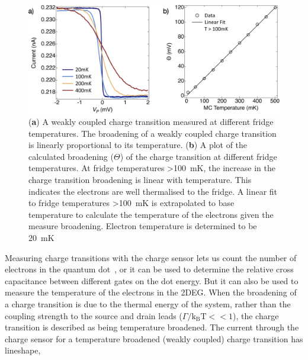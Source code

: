 \begin{figure}[!htb]
  \begin{center}
    \includegraphics[width=1.0\textwidth]{figures/ch1/crop_FiguresMaster.007.png}
    \caption[Calculating the electron temperature]{\label{fig:ch1/electron_temp} 
    (\textbf{a}) A weakly coupled charge transition measured at different fridge temperatures. The broadening of a weakly coupled charge transition is linearly proportional to its temperature. (\textbf{b}) A plot of the calculated broadening ($\Theta$) of the charge transition at different fridge temperatures. At fridge temperatures \qty{>100}{mK}, the increase in the charge transition broadening is linear with temperature. This indicates the electrons are well thermalised to the fridge. A linear fit to fridge temperatures \qty{>100}{mK} is extrapolated to base temperature to calculate the temperature of the electrons given the measure broadening. Electron temperature is determined to be \qty{20}{mK}
      }
  \end{center}
\end{figure}

Measuring charge transitions with the charge sensor lets us count the number of electrons in the quantum dot~\cite{electron_counting}, or it can be used to determine the relative cross capacitance between different gates on the dot energy.
But it can also be used to measure the temperature of the electrons in the 2DEG. When the broadening of a charge transition is due to the thermal energy of the system, rather than the coupling strength to the source and drain leads ($\Gamma/\mathrm{k_BT} << 1$), the charge transition is described as being temperature broadened. The current through the charge sensor for a temperature broadened (weakly coupled) charge transition has lineshape,

